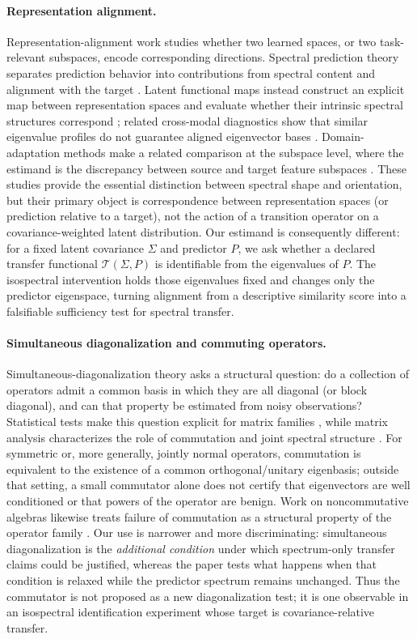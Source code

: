 \documentclass{article}
\begin{document}
\paragraph{Representation alignment.}
Representation-alignment work studies whether two learned spaces, or two task-relevant subspaces, encode corresponding directions. Spectral prediction theory separates prediction behavior into contributions from spectral content and alignment with the target \citep{canatar2023spectral}. Latent functional maps instead construct an explicit map between representation spaces and evaluate whether their intrinsic spectral structures correspond \citep{fumero2024lfm}; related cross-modal diagnostics show that similar eigenvalue profiles do not guarantee aligned eigenvector bases \citep{sarkar2026spectralgeometry}. Domain-adaptation methods make a related comparison at the subspace level, where the estimand is the discrepancy between source and target feature subspaces \citep{fernando2014subspace,thopalli2022subspace}. These studies provide the essential distinction between spectral shape and orientation, but their primary object is correspondence between representation spaces (or prediction relative to a target), not the action of a transition operator on a covariance-weighted latent distribution. Our estimand is consequently different: for a fixed latent covariance $\Sigma$ and predictor $P$, we ask whether a declared transfer functional $\mathcal{T}(\Sigma,P)$ is identifiable from the eigenvalues of $P$. The isospectral intervention holds those eigenvalues fixed and changes only the predictor eigenspace, turning alignment from a descriptive similarity score into a falsifiable sufficiency test for spectral transfer.

\paragraph{Simultaneous diagonalization and commuting operators.}
Simultaneous-diagonalization theory asks a structural question: do a collection of operators admit a common basis in which they are all diagonal (or block diagonal), and can that property be estimated from noisy observations? Statistical tests make this question explicit for matrix families \citep{xu2021simdiag}, while matrix analysis characterizes the role of commutation and joint spectral structure \citep{bhatia1997matrix,stewart1990matrix}. For symmetric or, more generally, jointly normal operators, commutation is equivalent to the existence of a common orthogonal/unitary eigenbasis; outside that setting, a small commutator alone does not certify that eigenvectors are well conditioned or that powers of the operator are benign. Work on noncommutative algebras likewise treats failure of commutation as a structural property of the operator family \citep{parada2021noncommutative}. Our use is narrower and more discriminating: simultaneous diagonalization is the \emph{additional condition} under which spectrum-only transfer claims could be justified, whereas the paper tests what happens when that condition is relaxed while the predictor spectrum remains unchanged. Thus the commutator is not proposed as a new diagonalization test; it is one observable in an isospectral identification experiment whose target is covariance-relative transfer.
\end{document}
